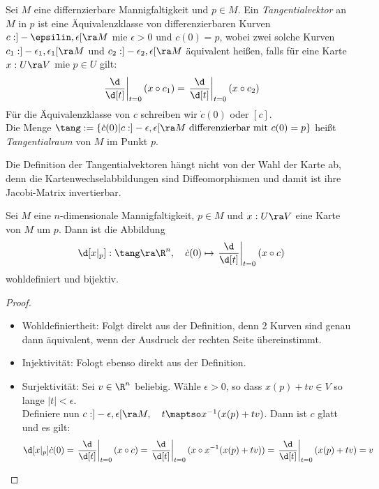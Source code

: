 \begin{defin}[Tangentialraum]
  Sei $M$ eine differnzierbare Mannigfaltigkeit und $p \in M$. Ein \emph{Tangentialvektor} an $M$ in $p$ ist eine Äquivalenzklasse von differenzierbaren Kurven $c: ]- \epsilin, \epsilon[ \ra M$ mie $\epsilon > 0$ und $c(0) = p$, wobei zwei solche Kurven $c_1 : ]- \epsilon_1, \epsilon_1[ \ra M$ und $c_2 : ]- \epsilon_2, \epsilon [ \ra M$ äquivalent heißen, falls für eine Karte $x: U \ra V$ mie $p \in U$ gilt:
  \[
  \left . \frac{\d}{\d[t]} \right |_{t=0} (x \circ c_1) = \left . \frac{\d}{\d[t]} \right |_{t=0} (x \circ c_2) 
  \]
  Für die Äquivalenzklasse von $c$ schreiben wir $\dot c(0)$ oder $[c]$. \\
  Die Menge $\tang := \{ \dot c(0) | c:]- \epsilon, \epsilon [ \ra M \text{ differenzierbar mit } c(0) = p\}$ heißt \emph{Tangentialraum} von $M$ im Punkt $p$.
\end{defin}

\begin{rem}
  Die Definition der Tangentialvektoren hängt nicht von der Wahl der Karte ab, denn die Kartenwechselabbildungen sind Diffeomorphismen und damit ist ihre Jacobi-Matrix invertierbar.
\end{rem}

\begin{lemma}
  Sei $M$ eine $n$-dimensionale Mannigfaltigkeit, $p \in M$ und $x: U \ra V$ eine Karte von $M$ um $p$. Dann ist die Abbildung
  \[
  \d[x|_p] : \tang \ra \R^n, \quad \dot c(0) \mapsto \left . \frac{\d}{\d[t]} \right |_{t=0} (x \circ c) 
  \]
  wohldefiniert und bijektiv.
  \label{lemma:tangentialraum}
\end{lemma}

\begin{proof}
  \begin{itemize}
    \item Wohldefiniertheit: Folgt direkt aus der Definition, denn 2 Kurven sind genau dann äquivalent, wenn der Ausdruck der rechten Seite übereinstimmt.
    \item Injektivität: Fologt ebenso direkt aus der Definition.
    \item Surjektivität: Sei $v \in \R^n$ beliebig. Wähle $\epsilon > 0$, so dass $x(p) + tv \in V$ so lange $|t| < \epsilon$. \\
      Definiere nun $c: ]-\epsilon, \epsilon[ \ra M, \quad t \maptso x^{-1}(x(p) + tv)$. Dann ist $c$ glatt und es gilt:
      \[
      \d[x|_p] \dot c(0) = \left . \frac{\d}{\d[t]} \right |_{t=0} (x \circ c) = \left . \frac{\d}{\d[t]} \right |_{t=0} (x \circ x^{-1}( x(p) + t v)) = \left . \frac{\d}{\d[t]} \right |_{t=0} (x(p) + tv) = v
      \]
  \end{itemize}
\end{proof}

